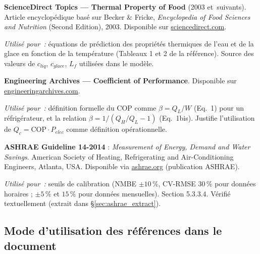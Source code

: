 \documentclass[11pt,a4paper]{article}
\begin{document}
\begin{enumerate}[label={[\arabic*]},itemsep=4pt,start=8]

\item \label{thermalpropertyfood}
\textbf{ScienceDirect Topics — Thermal Property of Food} (2003 et~suivants). Article
encyclopédique basé sur Becker \& Fricke, \emph{Encyclopedia of Food Sciences and
Nutrition} (Second Edition), 2003. Disponible sur \href{https://www.sciencedirect.com/topics/food-science/thermal-property-of-food}
{sciencedirect.com}.

\textit{Utilisé pour~:} équations de prédiction des propriétés thermiques de l'eau et de
la glace en fonction de la température (Tableaux 1 et 2 de la référence). Source des
valeurs de $c_{liq}$, $c_{glace}$, $L_f$ utilisées dans le modèle.

\medskip
\item \label{engarc_cop}
\textbf{Engineering Archives — Coefficient of Performance}. Disponible sur
\href{https://www.engineeringarchives.com}{engineeringarchives.com}.

\textit{Utilisé pour~:} définition formelle du COP comme $\beta = Q_L/W$ (Eq.~1) pour un
réfrigérateur, et la relation $\beta = 1/(Q_H/Q_L - 1)$ (Eq.~1bis). Justifie l'utilisation
de $Q_c = \mathrm{COP} \cdot P_{elec}$ comme définition opérationnelle.

\medskip
\item \label{ashrae14}
\textbf{ASHRAE Guideline 14-2014} : \emph{Measurement of Energy, Demand and Water Savings}.
American Society of Heating, Refrigerating and Air-Conditioning Engineers, Atlanta, USA.
Disponible via \href{https://www.ashrae.org}{ashrae.org} (publication ASHRAE).

\textit{Utilisé pour~:} seuils de calibration (NMBE $\pm 10\,\%$, CV-RMSE $30\,\%$ pour
données horaires ; $\pm 5\,\%$ et $15\,\%$ pour données mensuelles). Section 5.3.3.4.
Vérifié textuellement (extrait dans \S\ref{sec:ashrae_extract}).

\end{enumerate}

\subsection*{Mode d'utilisation des références dans le document}
\end{document}
